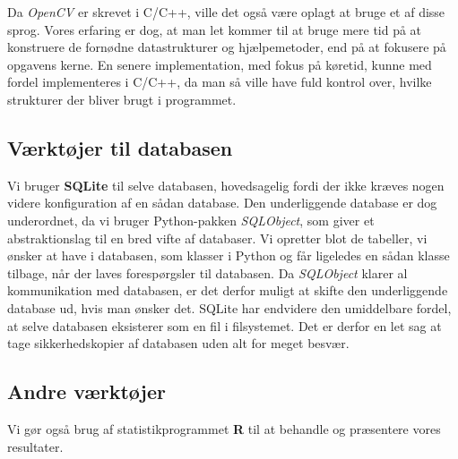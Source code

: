 {Da \emph{OpenCV} er skrevet i C/C++, ville det også være oplagt at bruge
et af disse sprog. Vores erfaring er dog, at man let kommer til at bruge
mere tid på at konstruere de fornødne datastrukturer og hjælpemetoder,
end på at fokusere på opgavens kerne. En senere implementation, med
fokus på køretid, kunne med fordel implementeres i C/C++, da man så
ville have fuld kontrol over, hvilke strukturer der bliver brugt i
programmet.

\subsection{Værktøjer til databasen}
Vi bruger \textbf{SQLite} til selve databasen, hovedsagelig fordi der ikke
kræves nogen videre konfiguration af en sådan database. Den
underliggende database er dog underordnet, da vi bruger Python-pakken
\emph{SQLObject}, som giver et abstraktionslag til en bred vifte af
databaser. Vi opretter blot de tabeller, vi ønsker at have i databasen,
som klasser i Python og får ligeledes en sådan klasse tilbage, når der
laves forespørgsler til databasen. Da \emph{SQLObject} klarer al
kommunikation med databasen, er det derfor muligt at skifte den
underliggende database ud, hvis man ønsker det. SQLite har endvidere den
umiddelbare fordel, at selve databasen eksisterer som en fil i
filsystemet.  Det er derfor en let sag at tage sikkerhedskopier af
databasen uden alt for meget besvær.

\subsection{Andre værktøjer}
Vi gør også brug af statistikprogrammet \textbf{R} til at behandle og
præsentere vores resultater.

}

